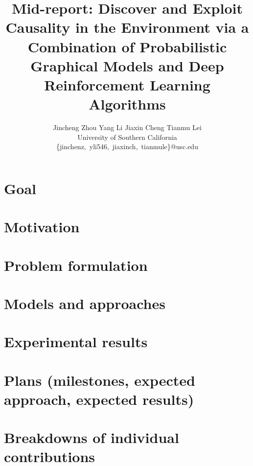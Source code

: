 \documentclass{article}
\title{Mid-report: Discover and Exploit Causality in the Environment via a Combination of Probabilistic Graphical Models and Deep Reinforcement Learning Algorithms}
\author{%
  Jincheng Zhou \qquad Yang Li \qquad Jiaxin Cheng \qquad Tianmu Lei \vspace{.3em} \\ 
  \large University of Southern California \vspace{.2em}\\ 
  \normalsize
  \{jinchenz,~yli546,~jiaxinch,~tianmule\}@usc.edu 
}
\begin{document}
 

\maketitle

\section{Goal}

\section{Motivation}

\section{Problem formulation}

\section{Models and approaches}

\section{Experimental results}

\section{Plans (milestones, expected approach, expected results)}

\section{Breakdowns of individual contributions}
\end{document}
